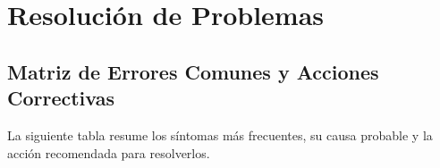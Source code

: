 \chapter{Resolución de Problemas}
\label{ch:troubleshooting}

\section{Matriz de Errores Comunes y Acciones Correctivas}
\label{sec:matriz-errores}

La siguiente tabla resume los síntomas más frecuentes, su causa probable y la acción
recomendada para resolverlos.

